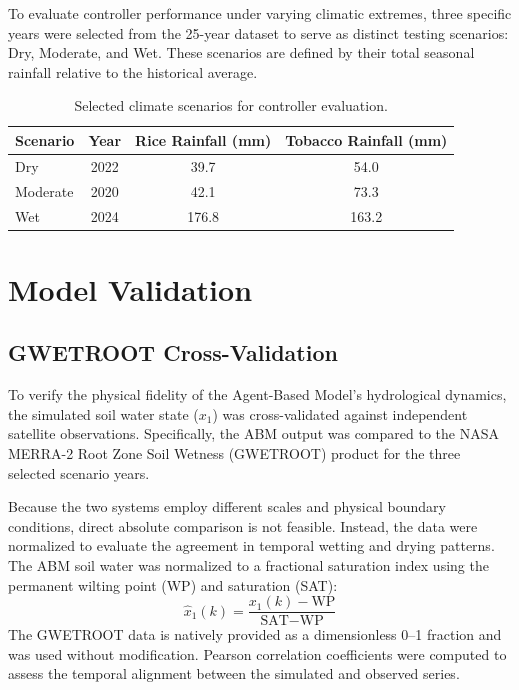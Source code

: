 To evaluate controller performance under varying climatic extremes, three specific years were selected from the 25-year dataset to serve as distinct testing scenarios: Dry, Moderate, and Wet. These scenarios are defined by their total seasonal rainfall relative to the historical average.

\begin{table}[H]
\centering
\caption{Selected climate scenarios for controller evaluation.}
\label{tab:scenarios}
\begin{tabular}{lccc}
\toprule
\textbf{Scenario} & \textbf{Year} & \textbf{Rice Rainfall (mm)} & \textbf{Tobacco Rainfall (mm)} \\
\midrule
Dry & 2022 & 39.7 & 54.0 \\
Moderate & 2020 & 42.1 & 73.3 \\
Wet & 2024 & 176.8 & 163.2 \\
\bottomrule
\end{tabular}
\end{table}

\section{Model Validation}
\label{sec:validation}

\subsection{GWETROOT Cross-Validation}

To verify the physical fidelity of the Agent-Based Model's hydrological dynamics, the simulated soil water state ($x_1$) was cross-validated against independent satellite observations. Specifically, the ABM output was compared to the NASA MERRA-2 Root Zone Soil Wetness (GWETROOT) product for the three selected scenario years.

Because the two systems employ different scales and physical boundary conditions, direct absolute comparison is not feasible. Instead, the data were normalized to evaluate the agreement in temporal wetting and drying patterns. The ABM soil water was normalized to a fractional saturation index using the permanent wilting point (WP) and saturation (SAT):
\begin{equation}
    \hat{x}_1(k) = \frac{x_1(k) - \text{WP}}{\text{SAT} - \text{WP}}
\end{equation}
The GWETROOT data is natively provided as a dimensionless 0--1 fraction and was used without modification. Pearson correlation coefficients were computed to assess the temporal alignment between the simulated and observed series.

